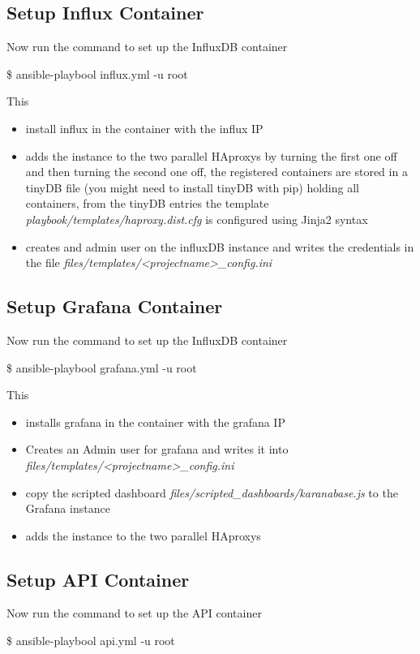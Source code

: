 \subsection{Setup Influx Container}
Now run the command to set up the InfluxDB container
\begin{tcolorbox}
	\$	ansible-playbool influx.yml -u root
\end{tcolorbox}

This
\begin{itemize}
	\item install influx in the container with the influx IP
	\item adds the instance to the two parallel HAproxys by turning the first one off and then turning the second one off, the registered containers are stored in a tinyDB file (you might need to install tinyDB with pip) holding all containers, from the tinyDB entries the template \textit{playbook/templates/haproxy.dist.cfg} is configured using Jinja2 syntax
	\item creates and admin user on the influxDB instance and writes the credentials in the file \textit{files/templates/<projectname>\_config.ini}
\end{itemize} 

\subsection{Setup Grafana Container}
Now run the command to set up the InfluxDB container
\begin{tcolorbox}
	\$	ansible-playbool grafana.yml -u root
\end{tcolorbox}

This
\begin{itemize}
	\item installs grafana in the container with the grafana IP
	\item Creates an Admin user for grafana and writes it into  \textit{files/templates/<projectname>\_config.ini}
	\item copy the scripted dashboard  \textit{files/scripted\_dashboards/karanabase.js} to the Grafana instance
	\item adds the instance to the two parallel HAproxys
\end{itemize}

\subsection{Setup API Container}
Now run the command to set up the API container
\begin{tcolorbox}
	\$	ansible-playbool api.yml -u root
\end{tcolorbox}